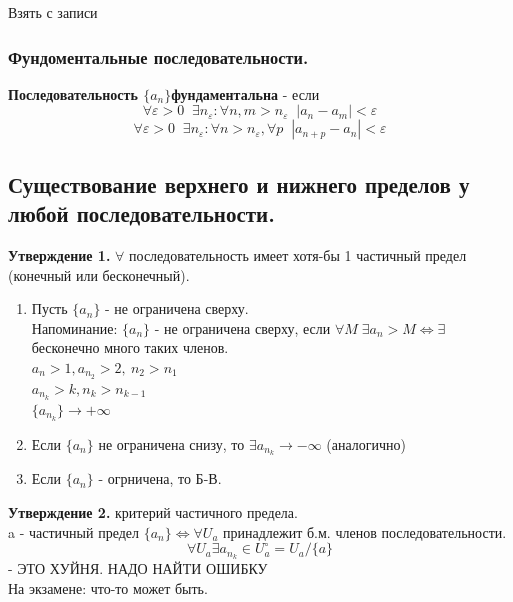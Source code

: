 \documentclass[12pt, a4paper]{article}
\newcommand{\eps}{\varepsilon}
\begin{document}
\begin{centering}
\begin{tcolorbox}[title=Доказательство]
    Взять с записи
\end{tcolorbox}

\subsubsection{Фундоментальные последовательности.}
\begin{tcolorbox}
    \textbf{Последовательность $\{a_n\} $фундаментальна} - если
    \[\forall \eps>0 \;\; \exists n_\eps : \forall n, m > n_\eps \;\; |a_n-a_m| < \eps\]
    \[ \forall \eps>0 \;\; \exists n_\eps : \forall n > n_\eps,\forall  p \;\; |a_{n+p}-a_n| < \eps \]
\end{tcolorbox}

\subsection{Существование верхнего и нижнего пределов у любой последовательности.}

\textbf{Утверждение 1.} $\forall$ последовательность имеет хотя-бы 1 частичный предел (конечный или бесконечный).
\begin{tcolorbox}[title=Доказательство]
    \begin{enumerate}
        \item Пусть $\{a_n\}$ - не ограничена сверху.\\
        Напоминание: $\{ a_n \}$ - не ограничена сверху, если $\forall M\; \exists a_n > M \Leftrightarrow \exists$ бесконечно много таких членов.\\
        $a_n > 1, a_{n_2} > 2,\ n_2>n_1$\\
        $a_{n_k} > k, n_k > n_{k-1}$\\
        $\{a_{n_k}\} \to +\infty$
        \item Если $\{a_n\}$ не ограничена снизу, то $\exists a_{n_k}\to -\infty$ (аналогично)
        \item Если $\{a_n\}$ - огрничена, то Б-В.
        
    \end{enumerate}
\end{tcolorbox}

\textbf{Утверждение 2.} критерий частичного предела.\\
a - частичный предел $\{a_n\} \Leftrightarrow \forall U_a$ принадлежит б.м. членов последовательности.
\[ \forall U_a \exists a_{n_k}\in U_a^\circ = U_a /\{a\} \] - ЭТО ХУЙНЯ. НАДО НАЙТИ ОШИБКУ\\
На экзамене: что-то может быть.\\


\end{centering}
\end{document}

